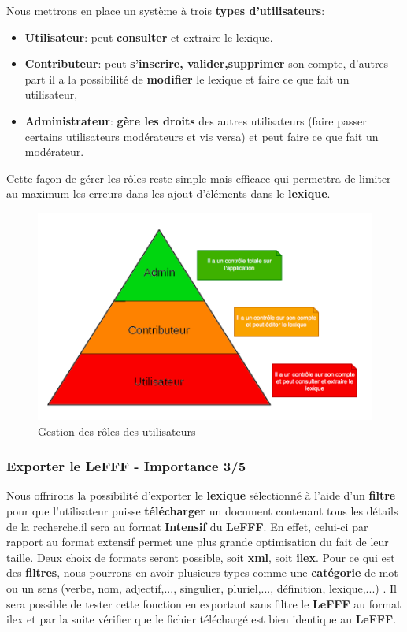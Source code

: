 {Nous mettrons en place un système à trois \textbf{types d'utilisateurs}:
\begin{itemize}
\item \textbf{Utilisateur}:  peut \textbf{consulter} et extraire le lexique.
\item \textbf{Contributeur}: peut \textbf{s'inscrire, valider,supprimer} son compte, d'autres part il a la possibilité de \textbf{modifier} le lexique et faire ce que fait un utilisateur,
\item \textbf{Administrateur}: \textbf{gère les droits} des autres utilisateurs (faire passer certains utilisateurs modérateurs et vis versa) et peut faire ce que fait un modérateur.
\end{itemize}
{Cette façon de gérer les rôles reste simple mais efficace qui permettra de limiter au maximum les erreurs dans les ajout d'éléments dans le \textbf{lexique}.\par}

\begin{figure}[ht]
    \centering
    \includegraphics[scale=0.5]{role.png}
    \caption{Gestion des rôles des utilisateurs }
\end{figure}
\newpage
    


\subsubsection{Exporter le LeFFF - Importance 3/5}

{Nous offrirons la possibilité d'exporter le \textbf{lexique} sélectionné à l'aide d'un \textbf{filtre} pour que l'utilisateur puisse \textbf{télécharger} un document contenant tous les détails de la recherche,il sera au format \textbf{Intensif} du \textbf{LeFFF}. En effet, celui-ci par rapport au format extensif permet une plus grande optimisation du fait de leur taille. Deux choix de formats seront possible, soit \textbf{xml}, soit \textbf{ilex}. Pour ce qui est des \textbf{filtres}, nous pourrons en avoir plusieurs types comme une \textbf{catégorie} de mot ou un sens (verbe, nom, adjectif,..., singulier, pluriel,..., définition, lexique,...) . Il sera possible de tester cette fonction en exportant sans filtre le \textbf{LeFFF} au format ilex et par la suite vérifier que le fichier téléchargé est bien identique au \textbf{LeFFF}.\par}

}
